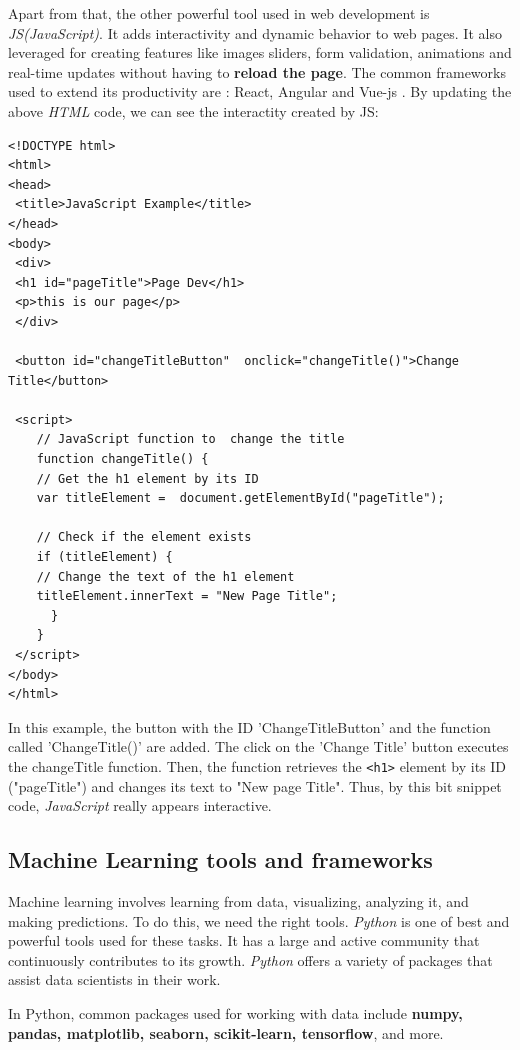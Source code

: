 \documentclass[12pt,a4paper]{report}
\begin{document}
Apart from that, the other powerful tool used in web development is \textit{JS(JavaScript)}. It adds interactivity and dynamic behavior to web pages. It also leveraged for creating features like images sliders, form validation, animations and real-time updates without having to \textbf{reload the page}. The common frameworks used to extend its productivity are : React, Angular and Vue-js \cite{wohlgethan2018supportingweb}. By updating the above \textit{HTML} code, we can see the interactity created by JS: 
\begin{lstlisting}[style=stylepython, label=lst:jsCode]
<!DOCTYPE html>
<html>
<head>
 <title>JavaScript Example</title>
</head>
<body>
 <div>
 <h1 id="pageTitle">Page Dev</h1>
 <p>this is our page</p>
 </div>
	
 <button id="changeTitleButton"  onclick="changeTitle()">Change  Title</button>
	
 <script>
 	// JavaScript function to  change the title
 	function changeTitle() {
 	// Get the h1 element by its ID
 	var titleElement =  document.getElementById("pageTitle");
	
 	// Check if the element exists
 	if (titleElement) {
	// Change the text of the h1 element
 	titleElement.innerText = "New Page Title";
	  }
	}
 </script>
</body>
</html>	
\end{lstlisting} 

In this example, the button with the ID 'ChangeTitleButton' and the function called 'ChangeTitle()' are added. The click on the 'Change Title' button executes the changeTitle function. Then, the function retrieves the \texttt{<h1>} element by its
ID ("pageTitle") and changes its text to "New page Title". Thus, by this bit snippet code, \textit{JavaScript} really appears interactive.

\subsection{\large Machine Learning tools and frameworks}
Machine learning involves learning from data, visualizing, analyzing it, and making predictions. To do this, we need the right tools. \textit{Python} is one of best and powerful tools used for these tasks. It has a large and active community that continuously contributes to its growth. \textit{Python} offers a variety of packages that assist data scientists in their work.

In Python, common packages used for working with data include\textbf{ numpy, pandas, matplotlib, seaborn, scikit-learn, tensorflow}, and more.
\end{document}
